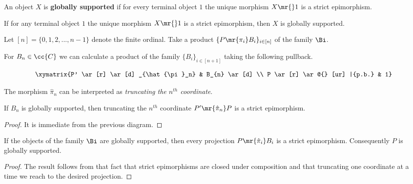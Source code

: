 \begin{definition} \label{globally supported}
An object $X$ is \textbf{globally supported} if for every terminal object $1$ the unique morphism $X \mr{} 1$ is a strict epimorphism.
\end{definition}

\begin{observation}
If for any terminal object $1$ the unique morphism $X \mr{} 1$ is a strict epimorphism, then $X$ is globally supported.
\end{observation}


 Let $[n]=\{0,1,2,...,n-1\}$ denote the finite ordinal. Take a product $\{P \mr{\pi_i} B_i\}_{i \in [n]}$ of the family $\Bi$. 
 
\begin{observation} 
For $B_{n} \in \cc{C}$ we can calculate a product of the family $\{B_i\}_{i \in [n+1]}$ taking the following pullback.

\begin{align*}
\xymatrix{P'  \ar [r]  \ar [d] _{\hat{\pi}_n}  &  B_{n}  \ar[d]  \\
		  P  \ar [r]  \ar @{} [ur] |{p.b.}  &  1}
\end{align*} 

The morphism $\hat{\pi}_n$ can be interpreted as \textit{truncating the $n^{th}$ coordinate}. 
\end{observation} 
 
\begin{lemma}
If $B_{n}$ is globally supported, then truncating the $n^{th}$ coordinate $P' \mr{\hat{\pi}_n} P$ is a strict epimorphism.
\end{lemma}

\begin{proof}
It is immediate from the previous diagram.
\end{proof}

\begin{corollary} \label{projectar es epi estricto}
If the objects of the family $\Bi$ are globally supported, then every projection $P \mr{\hat{\pi}_i} B_i$ is a strict epimorphism. Consequently $P$ is globally supported.
\end{corollary}

\begin{proof}
The result follows from that fact that strict epimorphisms are closed under composition and that truncating one coordinate at a time we reach to the desired projection. 
\end{proof}

